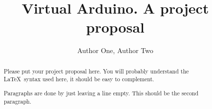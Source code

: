 \documentclass[a4paper]{article}
\author{Author One, Author Two}
\title{Virtual Arduino. A project proposal}
\begin{document}
\maketitle

\begin{abstract}
  Please put your project proposal here. You will probably understand
  the \LaTeX\ syntax used here, it should be easy to complement.

  Paragraphs are done by just leaving a line empty. This should be the
  second paragraph.
\end{abstract}
\end{document}
